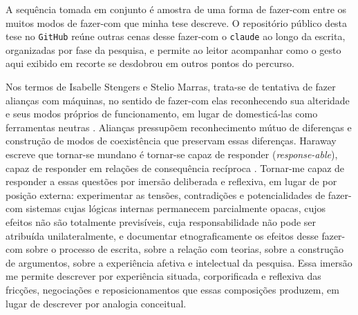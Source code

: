 A sequência tomada em conjunto é amostra de uma forma de fazer-com entre os muitos modos de fazer-com que minha tese descreve. O repositório público desta tese no \texttt{GitHub} reúne outras cenas desse fazer-com o \texttt{claude} ao longo da escrita, organizadas por fase da pesquisa, e permite ao leitor acompanhar como o gesto aqui exibido em recorte se desdobrou em outros pontos do percurso.

Nos termos de Isabelle Stengers e Stelio Marras, trata-se de tentativa de fazer alianças com máquinas, no sentido de fazer-com elas reconhecendo sua alteridade e seus modos próprios de funcionamento, em lugar de domesticá-las como ferramentas neutras \parencite{stengers2010cosmopolitics1, costa2024manchando}. Alianças pressupõem reconhecimento mútuo de diferenças e construção de modos de coexistência que preservam essas diferenças. Haraway escreve que tornar-se mundano é tornar-se capaz de responder (\textit{response-able}), capaz de responder em relações de consequência recíproca \parencite[p.~69]{Haraway2023Ficar}. Tornar-me capaz de responder a essas questões por imersão deliberada e reflexiva, em lugar de por posição externa: experimentar as tensões, contradições e potencialidades de fazer-com sistemas cujas lógicas internas permanecem parcialmente opacas, cujos efeitos não são totalmente previsíveis, cuja responsabilidade não pode ser atribuída unilateralmente, e documentar etnograficamente os efeitos desse fazer-com sobre o processo de escrita, sobre a relação com teorias, sobre a construção de argumentos, sobre a experiência afetiva e intelectual da pesquisa. Essa imersão me permite descrever por experiência situada, corporificada e reflexiva das fricções, negociações e reposicionamentos que essas composições produzem, em lugar de descrever por analogia conceitual.

